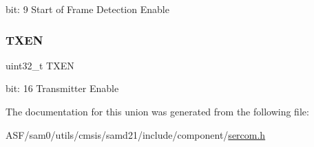 bit\+: 9 Start of Frame Detection Enable \mbox{\label{union_s_e_r_c_o_m___u_s_a_r_t___c_t_r_l_b___type_a990ff45da525fb99fc34219edef36ed7}} 
\subsubsection{\texorpdfstring{TXEN}{TXEN}}
{\footnotesize\ttfamily uint32\+\_\+t T\+X\+EN}

bit\+: 16 Transmitter Enable 

The documentation for this union was generated from the following file\+:\begin{DoxyCompactItemize}
\item 
A\+S\+F/sam0/utils/cmsis/samd21/include/component/\mbox{\hyperlink{utils_2cmsis_2samd21_2include_2component_2sercom_8h}{sercom.\+h}}\end{DoxyCompactItemize}
